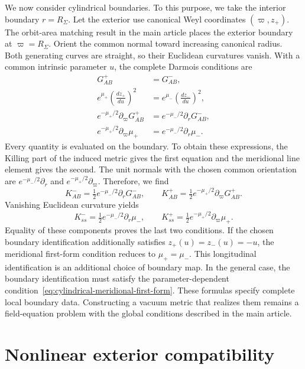\documentclass[11pt,a4paper]{article}
\numberwithin{equation}{section}
\theoremstyle{plain}
\theoremstyle{definition}
\theoremstyle{remark}
\begin{document}
We now consider cylindrical boundaries. To this purpose, we take the interior boundary $r=R_\Sigma$. Let the exterior use canonical Weyl coordinates $(\varpi,z_+)$. The orbit-area matching result in the main article places the exterior boundary at $\varpi=R_\Sigma$. Orient the common normal toward increasing canonical radius. Both generating curves are straight, so their Euclidean
curvatures vanish. With a common intrinsic parameter $u$, the complete
Darmois conditions are
\begin{align}
G_{AB}^+&=G_{AB}^-,\label{eq:cylindrical-G-match}\\
e^{\mu_+}\left(\frac{dz_+}{du}\right)^2
&=e^{\mu_-}\left(\frac{dz_-}{du}\right)^2,
\label{eq:cylindrical-meridional-first-form}\\
e^{-\mu_+/2}\partial_\varpi G_{AB}^+
&=e^{-\mu_-/2}\partial_rG_{AB}^-,
\label{eq:cylindrical-normal-G-match}\\
e^{-\mu_+/2}\partial_\varpi\mu_+
&=e^{-\mu_-/2}\partial_r\mu_-.
\label{eq:cylindrical-mu-match}
\end{align}
Every quantity is evaluated on the boundary. To obtain these expressions, the Killing part of the induced metric gives the first equation and the meridional line element gives the second. The unit normals with the chosen common orientation are
$e^{-\mu_-/2}\partial_r$ and $e^{-\mu_+/2}\partial_\varpi$. Therefore, we find
\begin{equation}
K_{AB}^- =\tfrac{1}{2}e^{-\mu_-/2}\partial_rG_{AB}^-,\qquad
K_{AB}^+ =\tfrac{1}{2}e^{-\mu_+/2}\partial_\varpi G_{AB}^+.
\end{equation}
Vanishing Euclidean curvature yields
\begin{equation}
K_{ss}^- =\tfrac{1}{2}e^{-\mu_-/2}\partial_r\mu_-,\qquad
K_{ss}^+ =\tfrac{1}{2}e^{-\mu_+/2}\partial_\varpi\mu_+.
\end{equation}
Equality of these components proves the last two conditions. If the chosen boundary identification additionally satisfies $z_+(u)=z_-(u)=-u$, the meridional first-form condition reduces to $\mu_+=\mu_-$. This longitudinal identification is an additional choice of boundary map. In the general case, the boundary identification must satisfy the parameter-dependent condition~\eqref{eq:cylindrical-meridional-first-form}. These formulas specify complete local boundary data. Constructing a vacuum metric that realizes them remains a field-equation problem with the global conditions described in the main article.

\section{Nonlinear exterior compatibility}
\label{supp:nonlinear-exterior}
\end{document}
